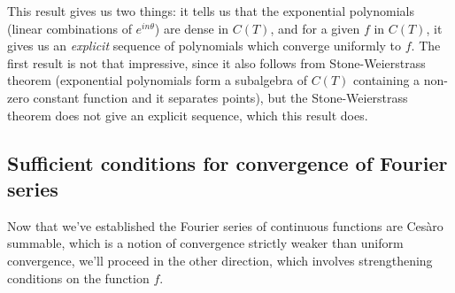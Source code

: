 \documentclass[12pt, titlepage]{article}
\theoremstyle{definition}
\begin{document}
This result gives us two things: it tells us that the exponential polynomials (linear combinations of $e^{in\theta}$) are dense in $C(T)$, and for a given $f$ in $C(T)$, it gives us an \emph{explicit} sequence of polynomials which converge uniformly to $f$. The first result is not that impressive, since it also follows from Stone-Weierstrass theorem (exponential polynomials form a subalgebra of $C(T)$ containing a non-zero constant function and it separates points), but the Stone-Weierstrass theorem does not give an explicit sequence, which this result does.

\subsection{Sufficient conditions for convergence of Fourier series}
Now that we've established the Fourier series of continuous functions are Cesàro summable, which is a notion of convergence strictly weaker than uniform convergence, we'll proceed in the other direction, which involves strengthening conditions on the function $f$.
\end{document}
